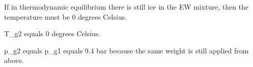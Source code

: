 If in thermodynamic equilibrium there is still ice in the EW mixture, then the temperature must be 0 degrees Celsius.  

T_g2 equals 0 degrees Celsius.  

p_g2 equals p_g1 equals 9.4 bar because the same weight is still applied from above.
